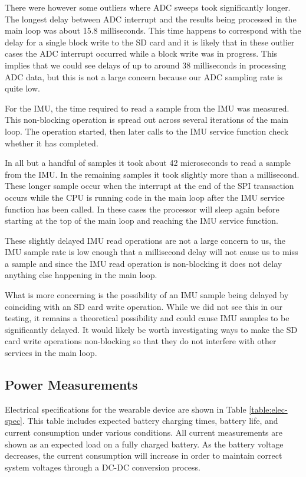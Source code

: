 There were however some outliers where ADC sweeps took significantly longer.
The longest delay between ADC interrupt and the results being processed in the
main loop was about 15.8 milliseconds. This time happens to correspond with the
delay for a single block write to the SD card and it is likely that in these
outlier cases the ADC interrupt occurred while a block write was in progress.
This implies that we could see delays of up to around 38 milliseconds in
processing ADC data, but this is not a large concern because our ADC sampling
rate is quite low.

For the IMU, the time required to read a sample from the IMU was measured. This
non-blocking operation is spread out across several iterations of the main loop.
The operation started, then later calls to the IMU service function check
whether it has completed.

In all but a handful of samples it took about 42 microseconds to read a sample
from the IMU. In the remaining samples it took slightly more than a millisecond.
These longer sample occur when the interrupt at the end of the SPI transaction
occurs while the CPU is running code in the main loop after the IMU service
function has been called. In these cases the processor will sleep again before
starting at the top of the main loop and reaching the IMU service function.

These slightly delayed IMU read operations are not a large concern to us, the
IMU sample rate is low enough that a millisecond delay will not cause us to
miss a sample and since the IMU read operation is non-blocking it does not delay
anything else happening in the main loop.

What is more concerning is the possibility of an IMU sample being delayed by
coinciding with an SD card write operation. While we did not see this in our
testing, it remains a theoretical possibility and could cause IMU samples to be
significantly delayed. It would likely be worth investigating ways to make the
SD card write operations non-blocking so that they do not interfere with other
services in the main loop.

\subsection{Power Measurements}

Electrical specifications for the wearable device are shown in Table \ref{table:elec-spec}.
This table includes expected battery charging times, battery life, and current 
consumption under various conditions. All current measurements are shown as an 
expected load on a fully charged battery. As the battery voltage decreases, the
current consumption will increase in order to maintain correct system voltages 
through a DC-DC conversion process.

